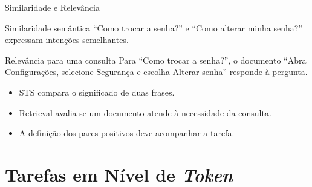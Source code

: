 \documentclass[aspectratio=169, xcolor=dvipsnames]{beamer}
\begin{document}
  \begin{frame}{Similaridade e Relevância}
    \begin{block}{Similaridade semântica}
      ``Como trocar a senha?'' e ``Como alterar minha senha?'' expressam
      intenções semelhantes.
    \end{block}
    \begin{block}{Relevância para uma consulta}
      Para ``Como trocar a senha?'', o documento ``Abra Configurações,
      selecione Segurança e escolha Alterar senha'' responde à pergunta.
    \end{block}
    \begin{itemize}
      \item STS compara o significado de duas frases.
      \item Retrieval avalia se um documento atende à necessidade da consulta.
      \item A definição dos pares positivos deve acompanhar a tarefa.
    \end{itemize}
  \end{frame}

  \section{Tarefas em Nível de \textit{Token}}
\end{document}
